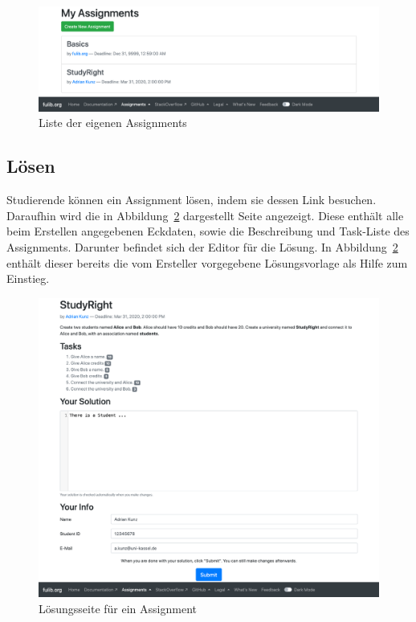\begin{figure}
    \centering
    \includegraphics[width=\textwidth]{chapter/fulib.org/img/my-assignments.png}
    \caption{Liste der eigenen Assignments}
    \label{fig:my-assignments}
\end{figure}

\subsection{Lösen}\label{subsec:solution}

Studierende können ein Assignment lösen, indem sie dessen Link besuchen.
Daraufhin wird die in Abbildung~\ref{fig:assignment-solve} dargestellt Seite angezeigt.
Diese enthält alle beim Erstellen angegebenen Eckdaten, sowie die Beschreibung und Task-Liste des Assignments.
Darunter befindet sich der Editor für die Lösung.
In Abbildung~\ref{fig:assignment-solve} enthält dieser bereits die vom Ersteller vorgegebene Lösungsvorlage als Hilfe zum Einstieg.

\begin{figure}
    \centering
    \includegraphics[width=\textwidth]{chapter/fulib.org/img/assignment-solve.png}
    \caption{Lösungsseite für ein Assignment}
    \label{fig:assignment-solve}
\end{figure}

